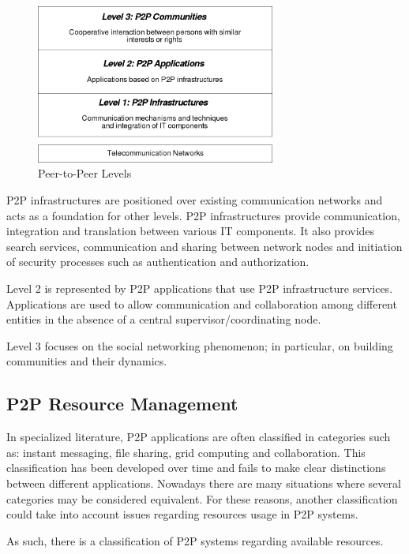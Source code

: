 \begin{figure}
  \centering
  \includegraphics[width=0.7\textwidth]{src/img/p2p-systems/p2p-levels}
  \caption{Peer-to-Peer Levels}
  \label{fig:p2p-systems:p2p-levels}
\end{figure}

P2P infrastructures are positioned over existing communication networks and
acts as a foundation for other levels. P2P infrastructures provide
communication, integration and translation between various IT components. It
also provides search services, communication and sharing between network
nodes and initiation of security processes such as authentication and
authorization.

Level 2 is represented by P2P applications that use P2P infrastructure
services. Applications are used to allow communication and collaboration
among different entities in the absence of a central supervisor/coordinating
node.

Level 3 focuses on the social networking phenomenon; in particular, on
building communities and their dynamics.

\subsection{P2P Resource Management}

In specialized literature, P2P applications are often classified in categories
such as: instant messaging, file sharing, grid computing and collaboration.
This classification has been developed over time and fails to make clear
distinctions between different applications. Nowadays there are many
situations where several categories may be considered equivalent. For these
reasons, another classification could take into account issues regarding
resources usage in P2P systems.

As such, there is a classification of P2P systems regarding available resources.

